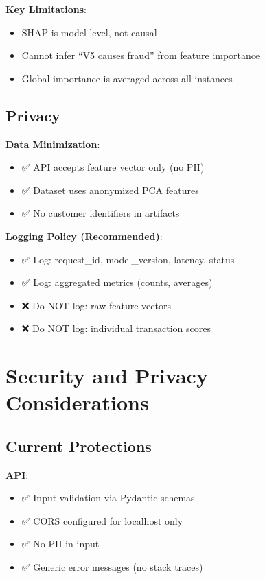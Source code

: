 \documentclass[12pt,a4paper]{article}
\begin{document}
\textbf{Key Limitations}:
\begin{itemize}
    \item SHAP is model-level, not causal
    \item Cannot infer ``V5 causes fraud'' from feature importance
    \item Global importance is averaged across all instances
\end{itemize}

\subsection{Privacy}

\textbf{Data Minimization}:
\begin{itemize}
    \item ✅ API accepts feature vector only (no PII)
    \item ✅ Dataset uses anonymized PCA features
    \item ✅ No customer identifiers in artifacts
\end{itemize}

\textbf{Logging Policy (Recommended)}:
\begin{itemize}
    \item ✅ Log: request\_id, model\_version, latency, status
    \item ✅ Log: aggregated metrics (counts, averages)
    \item ❌ Do NOT log: raw feature vectors
    \item ❌ Do NOT log: individual transaction scores
\end{itemize}

\section{Security and Privacy Considerations}

\subsection{Current Protections}

\textbf{API}:
\begin{itemize}
    \item ✅ Input validation via Pydantic schemas
    \item ✅ CORS configured for localhost only
    \item ✅ No PII in input
    \item ✅ Generic error messages (no stack traces)
\end{itemize}
\end{document}

